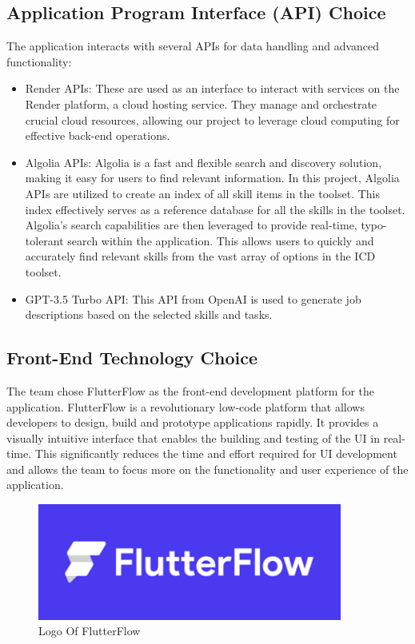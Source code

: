 \subsection{ Application Program Interface (API) Choice}
The application interacts with several APIs for data handling and advanced functionality:
\begin{itemize}
    \renewcommand\labelitemi{-}
    \item Render APIs: These are used as an interface to interact with services on the Render platform, a cloud hosting service. They manage and orchestrate crucial cloud resources, allowing our project to leverage cloud computing for effective back-end operations.
    \item Algolia APIs: Algolia is a fast and flexible search and discovery solution, making it easy for users to find relevant information. In this project, Algolia APIs are utilized to create an index of all skill items in the  toolset. This index effectively serves as a reference database for all the skills in the toolset. Algolia's search capabilities are then leveraged to provide real-time, typo-tolerant search within the application. This allows users to quickly and accurately find relevant skills from the vast array of options in the ICD toolset.
    \item GPT-3.5 Turbo API: This API from OpenAI is used to generate job descriptions based on the selected skills and tasks.
\end{itemize}

\subsection{Front-End Technology Choice}
The team chose {\color{purple} FlutterFlow} \cite{flutterflow} as the front-end development platform for the application. FlutterFlow is a revolutionary low-code platform that allows developers to design, build and prototype applications rapidly. It provides a visually intuitive interface that enables the building and testing of the UI in real-time. This significantly reduces the time and effort required for UI development and allows the team to focus more on the functionality and user experience of the application.

\begin{figure}[H]
    \centering
    \includegraphics[width=10cm]{src/assets/logos/flutterflowLogo.png}
    \caption{  Logo Of FlutterFlow }
    \label{fig:FlutterFlow_Logo}
\end{figure}

